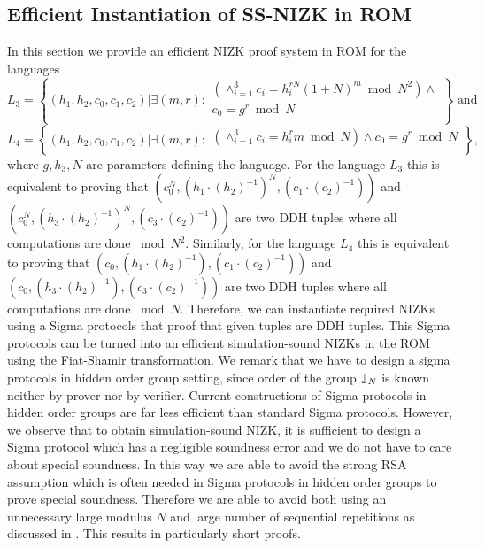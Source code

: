 \subsection{Efficient Instantiation of SS-NIZK in ROM}\label{sec:nizk}
In this section we provide an efficient NIZK proof system in ROM for the languages 
\[
L_3 = \left\{(h_1, h_2, c_0, c_1, c_2)| \exists (m,r):
\begin{aligned}
       (\land_{i=1}^3 c_i = h_i^{rN}(1+N)^m \bmod N^2) \land \\
       c_0 = g^r \bmod N\\
    \end{aligned}
    \right\} \text{ and }
\]
\[
L_4 = \left\{(h_1, h_2, c_0, c_1, c_2)| \exists (m,r):
\begin{aligned}
       (\land_{i=1}^3 c_i = h_i^{r}m \bmod N) \land
       c_0 = g^r \bmod N\\
    \end{aligned}
    \right\}, 
\]
where $g, h_3, N$ are parameters defining the language. For the language $L_3$ this is equivalent to proving that $(c_0^N, (h_1\cdot (h_2)^{-1})^N , (c_1\cdot (c_2)^{-1}))$ and $(c_0^N, (h_3\cdot (h_2)^{-1})^N, (c_3\cdot (c_2)^{-1}))$ are two DDH tuples where all computations are done $\bmod N^2$. Similarly, for the language $L_4$ this is equivalent to proving that $(c_0, (h_1\cdot (h_2)^{-1}), (c_1\cdot (c_2)^{-1}))$ and $(c_0, (h_3\cdot (h_2)^{-1}), (c_3\cdot (c_2)^{-1}))$ are two DDH tuples where all computations are done $\bmod N$. Therefore, we can instantiate required NIZKs using a Sigma protocols that proof that given tuples are DDH tuples. This Sigma protocols can be turned into an efficient simulation-sound NIZKs in the ROM using the Fiat-Shamir transformation. We remark that we have to design a sigma protocols in hidden order group setting, since order of the group $\mathbb{J}_N$ is known neither by prover nor by verifier. Current constructions of Sigma protocols in hidden order groups are far less efficient than standard Sigma protocols. However, we observe that to obtain simulation-sound NIZK, it is sufficient to design a Sigma protocol which has a negligible soundness error and we do not have to care about special soundness. In this way we are able to avoid the strong RSA assumption which is often needed in Sigma protocols in hidden order groups to prove special soundness. Therefore we are able to avoid both using an unnecessary large modulus $N$ and large number of sequential repetitions as discussed in \cite{SPEED:BKSST}. 
This results in particularly short proofs. 

